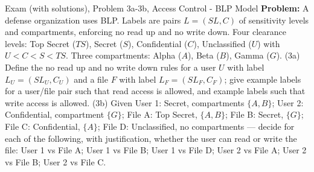 \documentclass[12pt, a4paper]{article}
\begin{document}
\begin{practicebox}{Exam (with solutions), Problem 3a-3b, Access Control - BLP Model}
\textbf{Problem:} A defense organization uses BLP. Labels are pairs $L = (SL, C)$ of sensitivity levels and compartments, enforcing no read up and no write down. Four clearance levels: Top Secret ($TS$), Secret ($S$), Confidential ($C$), Unclassified ($U$) with $U < C < S < TS$. Three compartments: Alpha ($A$), Beta ($B$), Gamma ($G$). (3a) Define the no read up and no write down rules for a user $U$ with label $L_U = (SL_U, C_U)$ and a file $F$ with label $L_F = (SL_F, C_F)$; give example labels for a user/file pair such that read access is allowed, and example labels such that write access is allowed. (3b) Given User 1: Secret, compartments $\{A, B\}$; User 2: Confidential, compartment $\{G\}$; File A: Top Secret, $\{A, B\}$; File B: Secret, $\{G\}$; File C: Confidential, $\{A\}$; File D: Unclassified, no compartments --- decide for each of the following, with justification, whether the user can read or write the file: User 1 vs File A; User 1 vs File B; User 1 vs File D; User 2 vs File A; User 2 vs File B; User 2 vs File C.


\end{practicebox}
\end{document}
